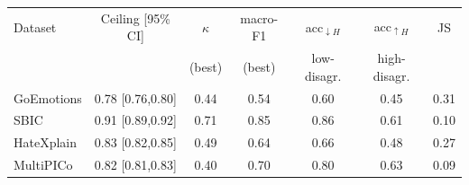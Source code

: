 \begin{tabular}{@{}l c c c c c c@{}}
\toprule
Dataset & Ceiling [95\% CI] & $\kappa$ & macro-F1 & acc$_{\downarrow H}$ & acc$_{\uparrow H}$ & JS \\
 & & (best) & (best) & low-disagr. & high-disagr. & \\
\midrule
GoEmotions & 0.78 [0.76,0.80] & 0.44 & 0.54 & 0.60 & 0.45 & 0.31 \\
SBIC & 0.91 [0.89,0.92] & 0.71 & 0.85 & 0.86 & 0.61 & 0.10 \\
HateXplain & 0.83 [0.82,0.85] & 0.49 & 0.64 & 0.66 & 0.48 & 0.27 \\
MultiPICo & 0.82 [0.81,0.83] & 0.40 & 0.70 & 0.80 & 0.63 & 0.09 \\
\bottomrule
\end{tabular}